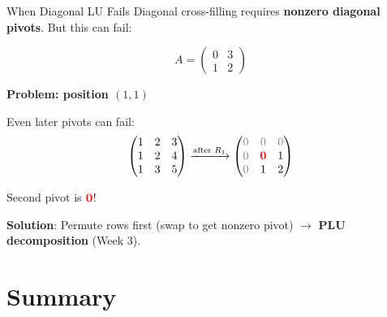 \documentclass[10pt]{beamer}
\theoremstyle{definition}
\newcommand{\pvt}[1]{{\color{red}\mathbf{#1}}}       %
\newcommand{\rem}[1]{{\color{gray}#1}}                %
\newcommand{\x}[1]{\alert{\textbf{#1}}}
\begin{document}
\begin{frame}[fragile]{When Diagonal LU Fails}
Diagonal cross-filling requires \x{nonzero diagonal pivots}. But this can fail:

$$A = \begin{pmatrix} 0 & 3 \\ 1 & 2 \end{pmatrix}$$

\textbf{Problem: position $(1,1)$}

\begin{center}
\end{center}

Even later pivots can fail:
$$\begin{pmatrix} 1 & 2 & 3 \\ 1 & 2 & 4 \\ 1 & 3 & 5 \end{pmatrix}
\xrightarrow{\text{after } R_1} \begin{pmatrix}
\rem{0} & \rem{0} & \rem{0} \\
\rem{0} & \pvt{0} & 1 \\
\rem{0} & 1 & 2
\end{pmatrix}$$

Second pivot is $\pvt{0}$!

\vspace{0.2cm}
\textbf{Solution}: Permute rows first (swap to get nonzero pivot) $\to$ \x{PLU decomposition} (Week 3).
\end{frame}

\section{Summary}
\end{document}
